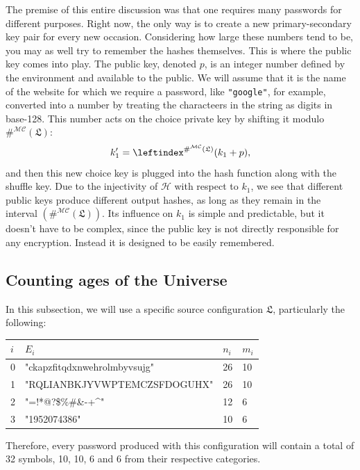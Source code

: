 \documentclass[12pt, a4paper]{article}
\renewcommand{\C}{\mathcal{C}}
\renewcommand{\H}{\mathcal{H}}
\newcommand{\M}{\mathcal{M}}
\newcommand{\conf}{\mathfrak{L}}
\newcommand{\lui}[1]{\leftindex^{#1}}
\begin{document}
The premise of this entire discussion was that one requires many passwords for different purposes. Right now, the only way is to create a new primary-secondary key pair for every new occasion. Considering how large these numbers tend to be, you may as well try to remember the hashes themselves. This is where the public key comes into play. The public key, denoted $ p $, is an integer number defined by the environment and available to the public. We will assume that it is the name of the website for which we require a password, like \texttt{"google"}, for example, converted into a number by treating the characteers in the string as digits in base-128. This number acts on the choice private key by shifting it modulo $ \#^{\M\C}(\conf) $:
\[ k_1' = \lui{\#^{\M\C}(\conf)}(k_1 + p), \] 
and then this new choice key is plugged into the hash function along with the shuffle key. Due to the injectivity of $ \H $ with respect to $ k_1 $, we see that different public keys produce different output hashes, as long as they remain in the interval $ \left( \#^{\M\C}(\conf) \right) $. Its influence on $ k_1 $ is simple and predictable, but it doesn't have to be complex, since the public key is not directly responsible for any encryption. Instead it is designed to be easily remembered.

\subsection{Counting ages of the Universe}\label{bignum}

In this subsection, we will use a specific source configuration $ \conf $, particularly the following:

\begin{center}
\def\arraystretch{1.2}
\begin{tabular}{l|l|l|l}\ttfamily
    $ i $ & $ E_i $ & $ n_i $ & $ m_i $\\
    \hline
    0 & \ttfamily"ckapzfitqdxnwehrolmbyvsujg" & 26 & 10\\
    1 & \ttfamily"RQLIANBKJYVWPTEMCZSFDOGUHX" & 26 & 10\\
    2 & \ttfamily"=!*@?\$\%\#\&-+\^{}"        & 12 & 6\\
    3 & \ttfamily"1952074386"                 & 10 & 6\\
\end{tabular}
\end{center}

Therefore, every password produced with this configuration will contain a total of 32 symbols, 10, 10, 6 and 6 from their respective categories.
\end{document}
